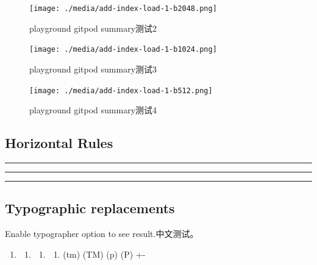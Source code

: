 \documentclass[
  paper=a4,
  ,captions=tableheading
]{scrartcl}
\providecommand{\tightlist}{%
  \setlength{\itemsep}{0pt}\setlength{\parskip}{0pt}}
\begin{document}
\begin{figure}
\centering
\texttt{[image: ./media/add-index-load-1-b2048.png]}
\caption{playground gitpod summary测试2}
\end{figure}

\begin{figure}
\centering
\texttt{[image: ./media/add-index-load-1-b1024.png]}
\caption{playground gitpod summary测试3}
\end{figure}

\begin{figure}
\centering
\texttt{[image: ./media/add-index-load-1-b512.png]}
\caption{playground gitpod summary测试4}
\end{figure}

\hypertarget{horizontal-rules}{%
\subsection{Horizontal Rules}\label{horizontal-rules}}

\begin{center}\rule{0.5\linewidth}{0.5pt}\end{center}

\begin{center}\rule{0.5\linewidth}{0.5pt}\end{center}

\begin{center}\rule{0.5\linewidth}{0.5pt}\end{center}

\hypertarget{typographic-replacements}{%
\subsection{Typographic replacements}\label{typographic-replacements}}

Enable typographer option to see result.中文测试。

\begin{enumerate}
\def\labelenumi{(\alph{enumi})}
\setcounter{enumi}{2}
\item
  \begin{enumerate}
  \def\labelenumii{(\Alph{enumii})}
  \setcounter{enumii}{2}
  \item
    \begin{enumerate}
    \def\labelenumiii{(\alph{enumiii})}
    \setcounter{enumiii}{17}
    \item
      \begin{enumerate}
      \def\labelenumiv{(\Alph{enumiv})}
      \setcounter{enumiv}{17}
      \tightlist
      \item
        (tm) (TM) (p) (P) +-
      \end{enumerate}
    \end{enumerate}
  \end{enumerate}
\end{enumerate}
\end{document}
